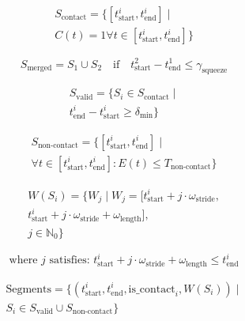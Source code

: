 \begin{align}
S_{\text{contact}} = \{[t_{\text{start}}^i, t_{\text{end}}^i] \mid \nonumber \\
C(t) = 1 \forall t \in [t_{\text{start}}^i, t_{\text{end}}^i]\}
\end{align}

\[
S_{\text{merged}} = S_1 \cup S_2 \quad \text{if} \quad t_{\text{start}}^2 - t_{\text{end}}^1 \leq \gamma_{\text{squeeze}}
\]

\begin{align}
S_{\text{valid}} = \{S_i \in S_{\text{contact}} \mid \nonumber \\
t_{\text{end}}^i - t_{\text{start}}^i \geq \delta_{\min}\}
\end{align}

\begin{align}
S_{\text{non-contact}} = \{[t_{\text{start}}^i, t_{\text{end}}^{i}] \mid \nonumber \\
\forall t \in [t_{\text{start}}^i, t_{\text{end}}^{i}]: E(t) \leq T_{\text{non-contact}}\}
\end{align}

\begin{align}
W(S_i) = \{W_j \mid W_j = [t_{\text{start}}^i + j \cdot \omega_{\text{stride}}, \nonumber \\
t_{\text{start}}^i + j \cdot \omega_{\text{stride}} + \omega_{\text{length}}], \nonumber \\
j \in \mathbb{N}_0\}
\end{align}

\[
\text{where } j \text{ satisfies: } t_{\text{start}}^i + j \cdot \omega_{\text{stride}} + \omega_{\text{length}} \leq t_{\text{end}}^i
\]

\begin{align}
\text{Segments} = \{(t_{\text{start}}^i, t_{\text{end}}^i, \text{is\_contact}_i, W(S_i)) \mid \nonumber \\
S_i \in S_{\text{valid}} \cup S_{\text{non-contact}}\}
\end{align}
